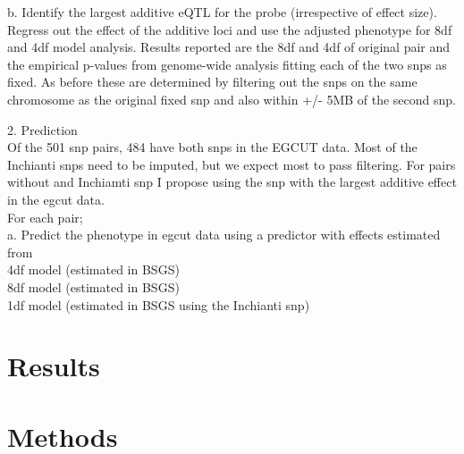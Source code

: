 \documentclass[paper=a4, fontsize=11pt]{scrartcl}					%
\numberwithin{equation}{section}									%
\numberwithin{figure}{section}										%
\numberwithin{table}{section}										%
\begin{document}
b. Identify the largest additive eQTL for the probe (irrespective of effect size). Regress out the effect of the additive loci and use the adjusted phenotype for 8df and 4df model analysis. Results reported are the 8df and 4df of original pair and the empirical p-values from genome-wide analysis fitting each of the two snps as fixed. As before these are determined by filtering out the snps on the same chromosome as the original fixed snp and also within +/- 5MB of the second snp. \\

\vspace{1cm}

2. Prediction \\

Of the 501 snp pairs, 484 have both snps in the EGCUT data. Most of the Inchianti snps need to be imputed, but we expect most to pass filtering. For pairs without and Inchiamti snp I propose using the snp with the largest additive effect in the egcut data. \\

For each pair; \\

a. Predict the phenotype in egcut data using a predictor with effects estimated from \\

4df model (estimated in BSGS) \\
8df model (estimated in BSGS) \\
1df model (estimated in BSGS using the Inchianti snp) \\









\newpage
\section{Results}







\section{Methods}



\end{document}

